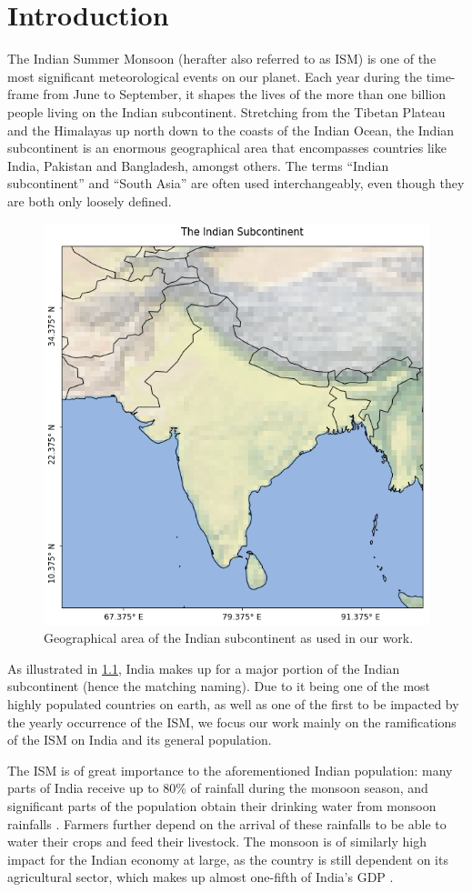 \chapter{Introduction}
\label{c:introduction}

The Indian Summer Monsoon (herafter also referred to as ISM) is one of the most significant meteorological events on our planet. Each year during the time-frame from June to September, it shapes the lives of the more than one billion people living on the Indian subcontinent. Stretching from the Tibetan Plateau and the Himalayas up north down to the coasts of the Indian Ocean, the Indian subcontinent is an enormous geographical area that encompasses countries like India, Pakistan and Bangladesh, amongst others. The terms ``Indian subcontinent'' and ``South Asia'' are often used interchangeably, even though they are both only loosely defined.

\begin{figure}[h]
  \centering
  \includegraphics[width=0.35\linewidth]{./99_appendix/img/area_overview}
  \caption{Geographical area of the Indian subcontinent as used in our work.}
  \label{fig:the_indian_subcontinent}
\end{figure}

As illustrated in \cref{fig:the_indian_subcontinent}, India makes up for a major portion of the Indian subcontinent (hence the matching naming). Due to it being one of the most highly populated countries on earth, as well as one of the first to be impacted by the yearly occurrence of the ISM, we focus our work mainly on the ramifications of the ISM on India and its general population.

The ISM is of great importance to the aforementioned Indian population: many parts of India receive up to 80\% of rainfall during the monsoon season, and significant parts of the population obtain their drinking water from monsoon rainfalls \citep{Stolbova.2015}. Farmers further depend on the arrival of these rainfalls to be able to water their crops and feed their livestock. The monsoon is of similarly high impact for the Indian economy at large, as the country is still dependent on its agricultural sector, which makes up almost one-fifth of India's GDP \citep{CentralIntelligenceAgency.05.01.2018}.

